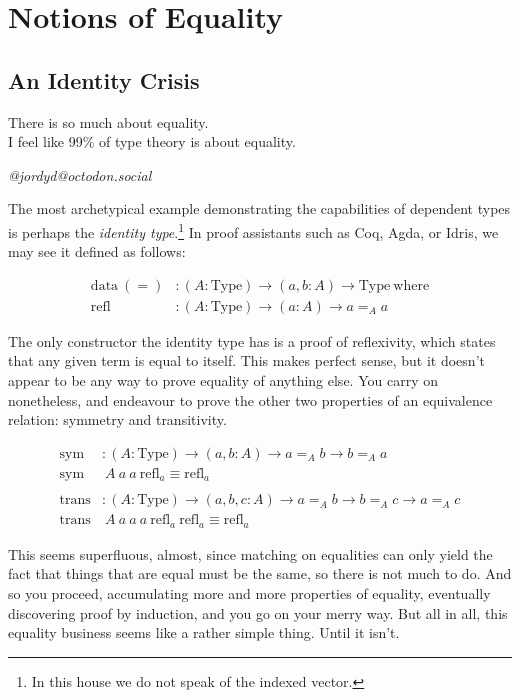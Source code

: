 \documentclass{report}
\newcommand{\const}[1]{\text{#1}}
\newcommand{\data}{\const{data}}
\newcommand{\Type}{\const{Type}}
\newcommand{\where}{\const{where}}
\newcommand{\refl}{\const{refl}}
\begin{document}
\chapter{Notions of Equality}
\section{An Identity Crisis}

\epigraph{There is so much about equality.\\ I feel like 99\% of type theory is about equality.}{\textit{@jordyd@octodon.social}}

The most archetypical example demonstrating the capabilities of dependent types is perhaps the \emph{identity type}.\footnote{In this house we do not speak of the indexed vector.} In proof assistants such as Coq, Agda, or Idris, we may see it defined as follows:

\begin{align*}
    \data ~ (=) &: (A : \Type) \to (a, b : A) \to \Type ~ \where \\
    \refl &: (A : \Type) \to (a : A) \to a =_A a
\end{align*}

The only constructor the identity type has is a proof of reflexivity, which states that any given term is equal to itself. This makes perfect sense, but it doesn't appear to be any way to prove equality of anything else. You carry on nonetheless, and endeavour to prove the other two properties of an equivalence relation: symmetry and transitivity.

\begin{align*}
    \text{sym} &: (A : \Type) \to (a, b : A) \to a =_A b \to b =_A a \\
    \text{sym} &~ A ~ a ~ a ~ \refl_a \equiv \refl_a \\
    \\
    \text{trans} &: (A : \Type) \to (a, b, c : A) \to a =_A b \to b =_A c \to a =_A c \\
    \text{trans} &~ A ~ a ~ a ~ a ~ \refl_a ~ \refl_a \equiv \refl_a
\end{align*}

This seems superfluous, almost, since matching on equalities can only yield the fact that things that are equal must be the same, so there is not much to do. And so you proceed, accumulating more and more properties of equality, eventually discovering proof by induction, and you go on your merry way. But all in all, this equality business seems like a rather simple thing. Until it isn't.
\end{document}
